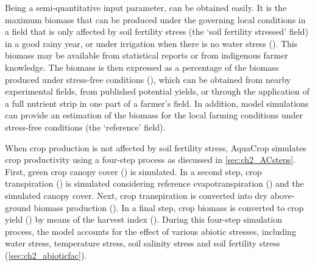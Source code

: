 Being a semi-quantitative input parameter, \Brel can be obtained easily. It is the maximum biomass that can be produced under the governing local conditions in a field that is only affected by soil fertility stress (the `soil fertility stressed' field) in a good rainy year, or under irrigation when there is no water stress (\Bstress). This biomass may be available from statistical reports or from indigenous farmer knowledge. The biomass is then expressed as a percentage of the biomass produced under stress-free conditions (\Bref), which can be obtained from nearby experimental fields, from published potential yields, or through the application of a full nutrient strip in one part of a farmer's field. In addition, model simulations can provide an estimation of the biomass for the local farming conditions under stress-free conditions (the `reference' field). 

When crop production is not affected by soil fertility stress, AquaCrop simulates crop productivity using a four-step process as discussed in \autoref{sec:ch2_ACsteps}. First, green crop canopy cover (\CC) is simulated. In a second step, crop transpiration (\Tr) is simulated considering reference evapotranspiration (\ETo) and the simulated canopy cover. Next, crop transpiration is converted into dry above-ground biomass production (\B). In a final step, crop biomass is converted to crop yield (\Y) by means of the harvest index (\HI). During this four-step simulation process, the model accounts for the effect of various abiotic stresses, including water stress, temperature stress, soil salinity stress and soil fertility stress (\autoref{sec:ch2_abioticfac}). 

